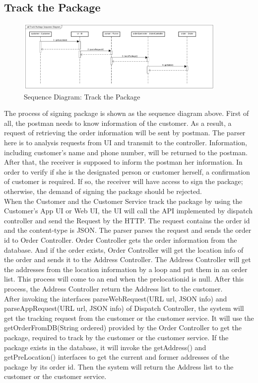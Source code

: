 \documentclass[12pt]{scrreprt}
\begin{document}
\subsection{Track the Package}
\begin{figure}[htbp]
	\centering\includegraphics[width=4in]{DocumentRes/8SequenceDiagram_track.png}
	\caption{Sequence Diagram: Track the Package}
\end{figure}
The process of signing package is shown as the sequence diagram above. First of all, the postman needs to know information of the customer. As a result, a request of retrieving the order information will be sent by postman. The parser here is to analysis requests from UI and transmit to the controller. Information, including customer's name and phone number, will be returned to the postman. After that, the receiver is supposed to inform the postman her information. In order to verify if she is the designated person or customer herself, a confirmation of customer is required. If so, the receiver will have access to sign the package; otherwise, the demand of signing the package should be rejected.\\
When the Customer and the Customer Service track the package by using the Customer's App UI or Web UI, the UI will call the API implemented by dispatch controller and send the Request by the HTTP. The request contains the order id and the content-type is JSON. The parser parses the request and sends the order id to Order Controller. Order Controller gets the order information from the database. And if the order exists, Order Controller will get the location info of the order and sends it to the Address Controller. The Address Controller will get the addresses from the location information by a loop and put them in an order list. This process will come to an end when the prelocationid is null. After this process, the Address Controller return the Address list to the customer.\\
After invoking the interfaces parseWebRequest(URL url, JSON info) and parseAppRequest(URL url, JSON info) of Dispatch Controller, the system will get the tracking request from the customer or the customer service. It will use the getOrderFromDB(String ordered) provided by the Order Controller to get the package, required to track by the customer or the customer service. If the package exists in the database, it will invoke the getAddress() and getPreLocation() interfaces to get the current and former addresses of the package by its order id. Then the system will return the Address list to the customer or the customer service.
\end{document}
